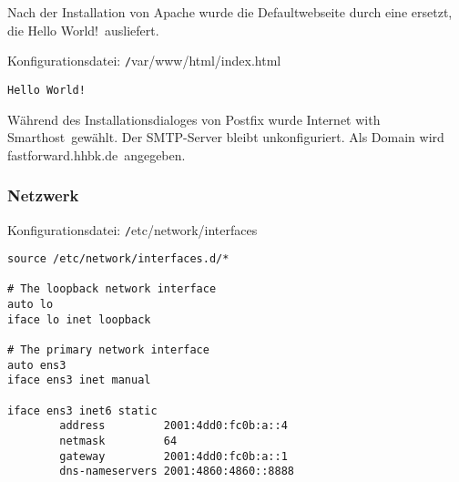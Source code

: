 Nach der Installation von Apache wurde die Defaultwebseite durch eine ersetzt, die \ql Hello World!\qr\ ausliefert.

Konfigurationsdatei: {\texttt /var/www/html/index.html}
\begin{lstlisting}
Hello World!
\end{lstlisting}

Während des Installationsdialoges von Postfix wurde \ql Internet with Smarthost\qr\ gewählt. Der SMTP-Server bleibt unkonfiguriert. Als Domain wird \ql fastforward.hhbk.de\qr\ angegeben.

\subsubsection{Netzwerk}

Konfigurationsdatei: {\texttt /etc/network/interfaces}
\begin{lstlisting}
source /etc/network/interfaces.d/*

# The loopback network interface
auto lo
iface lo inet loopback

# The primary network interface
auto ens3
iface ens3 inet manual

iface ens3 inet6 static
        address			2001:4dd0:fc0b:a::4
        netmask			64
        gateway			2001:4dd0:fc0b:a::1
        dns-nameservers	2001:4860:4860::8888
\end{lstlisting}

